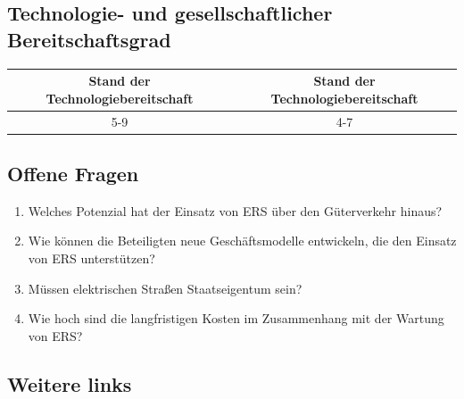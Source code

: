 \documentclass[
]{book}
\providecommand{\tightlist}{%
  \setlength{\itemsep}{0pt}\setlength{\parskip}{0pt}}
\begin{document}
\hypertarget{technologie--und-gesellschaftlicher-bereitschaftsgrad-1}{%
\subsection*{Technologie- und gesellschaftlicher Bereitschaftsgrad}\label{technologie--und-gesellschaftlicher-bereitschaftsgrad-1}}

\begin{longtable}[]{@{}cc@{}}
\toprule
Stand der Technologiebereitschaft & Stand der Technologiebereitschaft\tabularnewline
\midrule
\endhead
5-9 & 4-7\tabularnewline
\bottomrule
\end{longtable}

\hypertarget{offene-fragen-3}{%
\subsection*{Offene Fragen}\label{offene-fragen-3}}

\begin{enumerate}
\def\labelenumi{\arabic{enumi}.}
\tightlist
\item
  Welches Potenzial hat der Einsatz von ERS über den Güterverkehr hinaus?
\item
  Wie können die Beteiligten neue Geschäftsmodelle entwickeln, die den Einsatz von ERS unterstützen?
\item
  Müssen elektrischen Straßen Staatseigentum sein?
\item
  Wie hoch sind die langfristigen Kosten im Zusammenhang mit der Wartung von ERS?
\end{enumerate}

\hypertarget{weitere-links-2}{%
\subsection*{Weitere links}\label{weitere-links-2}}
\end{document}
